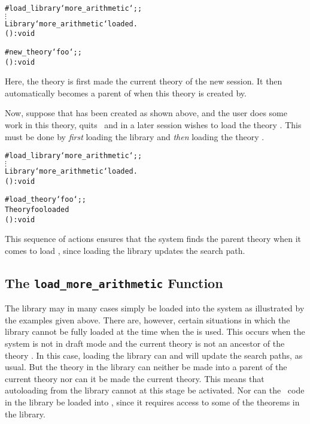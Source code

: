 \setcounter{sessioncount}{1}
\begin{session}\begin{alltt}
#load_library `more\_arithmetic`;;
  \(\vdots\)
Library `more\_arithmetic` loaded.
() : void

#new_theory `foo`;;
() : void
\end{alltt}\end{session}

\noindent Here, the theory  is first made the current theory of the
new session.  It then automatically becomes a parent of  when this
theory is created by\pagebreak[3] .

Now, suppose that  has been created as shown above, and the user does
some work in this theory, quits \HOL\, and in a later session wishes to load
the theory .  This must be done by {\it first\/} loading the
 library and {\it then\/} loading the theory .

\setcounter{sessioncount}{1}
\begin{session}\begin{alltt}
#load_library `more\_arithmetic`;;
  \(\vdots\)
Library `more\_arithmetic` loaded.
() : void

#load_theory `foo`;;
Theory foo loaded
() : void
\end{alltt}\end{session}

\noindent This sequence of actions ensures that the system finds the parent
theory  when it comes to load , since loading the library
updates the search path. 

\subsection{The {\tt load\_more\_arithmetic} Function}%

The  library may in many cases simply be loaded into the system as
illustrated by the examples given above.  There are, however, certain
situations in which the  library cannot be fully loaded at the time
when the  is used.  This occurs when the system is not in
draft mode and the current theory is not an ancestor of the theory .
In this case, loading the library can and will update the search paths, as
usual. But the  theory in the library can neither be made into a
parent of the current theory nor can it be made the current theory.  This means
that autoloading from the library cannot at this stage be activated.  Nor can
the \ML\ code in the library be loaded into \HOL, since it requires access to
some of the theorems in the library.

